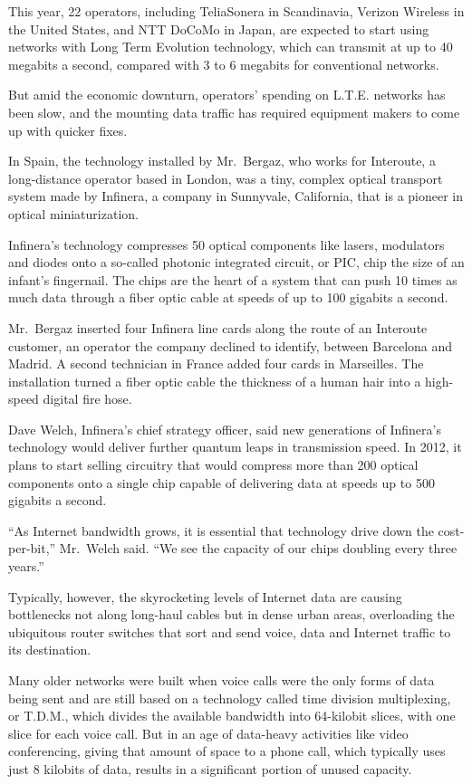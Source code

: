 ﻿\documentclass[12pt]{article}
\begin{document}
This year, 22 operators, including TeliaSonera in Scandinavia, Verizon Wireless in the United
States, and NTT DoCoMo in Japan, are expected to start using networks with Long Term Evolution
technology, which can transmit at up to 40 megabits a second, compared with 3 to 6 megabits for
conventional networks.

But amid the economic downturn, operators' spending on L.T.E. networks has been slow, and the
mounting data traffic has required equipment makers to come up with quicker fixes.

In Spain, the technology installed by Mr.~Bergaz, who works for Interoute, a long-distance operator
based in London, was a tiny, complex optical transport system made by Infinera, a company in
Sunnyvale, California, that is a pioneer in optical miniaturization.

Infinera's technology compresses 50 optical components like lasers, modulators and diodes onto a
so-called photonic integrated circuit, or PIC, chip the size of an infant's fingernail. The chips
are the heart of a system that can push 10 times as much data through a fiber optic cable at speeds
of up to 100 gigabits a second.

Mr.~Bergaz inserted four Infinera line cards along the route of an Interoute customer, an operator
the company declined to identify, between Barcelona and Madrid. A second technician in France added
four cards in Marseilles. The installation turned a fiber optic cable the thickness of a human hair
into a high-speed digital fire hose.

Dave Welch, Infinera's chief strategy officer, said new generations of Infinera's technology would
deliver further quantum leaps in transmission speed. In 2012, it plans to start selling circuitry
that would compress more than 200 optical components onto a single chip capable of delivering data
at speeds up to 500 gigabits a second.

``As Internet bandwidth grows, it is essential that technology drive down the cost-per-bit,''
Mr.~Welch said. ``We see the capacity of our chips doubling every three years.''

Typically, however, the skyrocketing levels of Internet data are causing bottlenecks not along
long-haul cables but in dense urban areas, overloading the ubiquitous router switches that sort and
send voice, data and Internet traffic to its destination.

Many older networks were built when voice calls were the only forms of data being sent and are still
based on a technology called time division multiplexing, or T.D.M., which divides the available
bandwidth into 64-kilobit slices, with one slice for each voice call. But in an age of data-heavy
activities like video conferencing, giving that amount of space to a phone call, which typically
uses just 8 kilobits of data, results in a significant portion of unused capacity.
\end{document}
